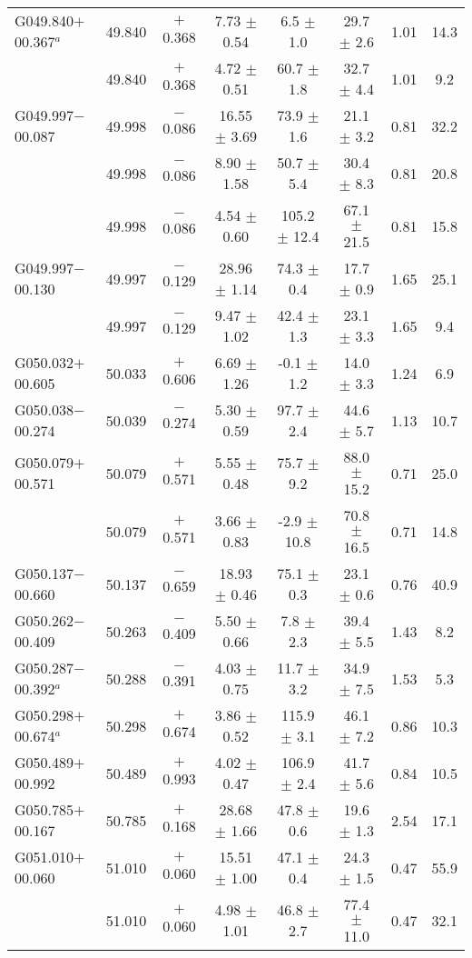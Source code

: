 \begin{ThreePartTable}
\begin{longtable}{lccccccc}
G049.840$+$00.367$^a$ &49.840&	$+$0.368	&7.73	$\pm$ 0.54	&6.5	$\pm$ 1.0	&29.7	$\pm$ 2.6	&1.01	&14.3\\
                      &49.840&	$+$0.368	&4.72	$\pm$ 0.51	&60.7	$\pm$ 1.8	&32.7	$\pm$ 4.4	&1.01	&9.2\\
G049.997$-$00.087     &49.998&	$-$0.086	&16.55	$\pm$ 3.69	&73.9	$\pm$ 1.6	&21.1	$\pm$ 3.2	&0.81	&32.2\\
                      &49.998&	$-$0.086	&8.90	$\pm$ 1.58	&50.7	$\pm$ 5.4	&30.4	$\pm$ 8.3	&0.81	&20.8\\
                      &49.998&	$-$0.086	&4.54	$\pm$ 0.60	&105.2	$\pm$ 12.4	&67.1	$\pm$ 21.5	&0.81	&15.8\\
G049.997$-$00.130     &49.997&	$-$0.129	&28.96	$\pm$ 1.14	&74.3	$\pm$ 0.4	&17.7	$\pm$ 0.9	&1.65	&25.1\\
                      &49.997&	$-$0.129	&9.47	$\pm$ 1.02	&42.4	$\pm$ 1.3	&23.1	$\pm$ 3.3	&1.65	&9.4\\
G050.032$+$00.605     &50.033&	$+$0.606	&6.69	$\pm$ 1.26	&-0.1	$\pm$ 1.2	&14.0	$\pm$ 3.3	&1.24	&6.9\\
G050.038$-$00.274     &50.039&	$-$0.274	&5.30	$\pm$ 0.59	&97.7	$\pm$ 2.4	&44.6	$\pm$ 5.7	&1.13	&10.7\\
G050.079$+$00.571     &50.079&	$+$0.571	&5.55	$\pm$ 0.48	&75.7	$\pm$ 9.2	&88.0	$\pm$ 15.2	&0.71	&25.0\\
                      &50.079&	$+$0.571	&3.66	$\pm$ 0.83	&-2.9	$\pm$ 10.8	&70.8	$\pm$ 16.5	&0.71	&14.8\\
G050.137$-$00.660     &50.137&	$-$0.659	&18.93	$\pm$ 0.46	&75.1	$\pm$ 0.3	&23.1	$\pm$ 0.6	&0.76	&40.9\\
G050.262$-$00.409     &50.263&	$-$0.409	&5.50	$\pm$ 0.66	&7.8	$\pm$ 2.3	&39.4	$\pm$ 5.5	&1.43	&8.2\\
G050.287$-$00.392$^a$ &50.288&	$-$0.391	&4.03	$\pm$ 0.75	&11.7	$\pm$ 3.2	&34.9	$\pm$ 7.5	&1.53	&5.3\\
G050.298$+$00.674$^a$ &50.298&	$+$0.674	&3.86	$\pm$ 0.52	&115.9	$\pm$ 3.1	&46.1	$\pm$ 7.2	&0.86	&10.3\\
G050.489$+$00.992     &50.489&	$+$0.993	&4.02	$\pm$ 0.47	&106.9	$\pm$ 2.4	&41.7	$\pm$ 5.6	&0.84	&10.5\\
G050.785$+$00.167     &50.785&	$+$0.168	&28.68	$\pm$ 1.66	&47.8	$\pm$ 0.6	&19.6	$\pm$ 1.3	&2.54	&17.1\\
G051.010$+$00.060     &51.010&	$+$0.060	&15.51	$\pm$ 1.00	&47.1	$\pm$ 0.4	&24.3	$\pm$ 1.5	&0.47	&55.9\\
                      &51.010&	$+$0.060	&4.98	$\pm$ 1.01	&46.8	$\pm$ 2.7	&77.4	$\pm$ 11.0	&0.47	&32.1\\

\end{longtable}
\end{ThreePartTable}
